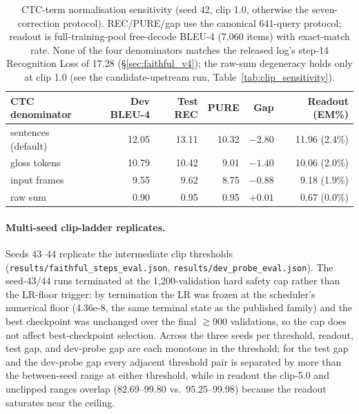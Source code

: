 \documentclass[pdflatex,sn-chicago]{sn-jnl}
\begin{document}
\begin{table}[h]
\centering
\scriptsize\setlength{\tabcolsep}{4pt}
\caption{CTC-term normalisation sensitivity (seed 42, clip 1.0, otherwise the seven-correction protocol). REC/PURE/gap use the canonical 641-query protocol; readout is full-training-pool free-decode BLEU-4 (7{,}060 items) with exact-match rate. None of the four denominators matches the released log's step-14 Recognition Loss of 17.28 (\S\ref{sec:faithful_v4}); the raw-sum degeneracy holds only at clip 1.0 (see the candidate-upstream run, Table~\ref{tab:clip_sensitivity}).}
\label{tab:ctc_sensitivity}
\begin{tabular}{lrrrrr}
\toprule
CTC denominator & Dev BLEU-4 & Test REC & PURE & Gap & Readout (EM\%) \\
\midrule
sentences (default) & 12.05 & 13.11 & 10.32 & $-2.80$ & 11.96 (2.4\%) \\
gloss tokens & 10.79 & 10.42 & 9.01 & $-1.40$ & 10.06 (2.0\%) \\
input frames & 9.55 & 9.62 & 8.75 & $-0.88$ & 9.18 (1.9\%) \\
raw sum & 0.90 & 0.95 & 0.95 & $+0.01$ & 0.67 (0.0\%) \\
\bottomrule
\end{tabular}
\end{table}


\clearpage
\paragraph{Multi-seed clip-ladder replicates.}
Seeds 43--44 replicate the intermediate clip thresholds (\texttt{results/faithful\_steps\_eval.json}, \texttt{results/dev\_probe\_eval.json}). The seed-43/44 runs terminated at the 1{,}200-validation hard safety cap rather than the LR-floor trigger: by termination the LR was frozen at the scheduler's numerical floor (4.36e-8, the same terminal state as the published family) and the best checkpoint was unchanged over the final $\gtrsim$900 validations, so the cap does not affect best-checkpoint selection. Across the three seeds per threshold, readout, test gap, and dev-probe gap are each monotone in the threshold; for the test gap and the dev-probe gap every adjacent threshold pair is separated by more than the between-seed range at either threshold, while in readout the clip-5.0 and unclipped ranges overlap (82.69--99.80 vs.\ 95.25--99.98) because the readout saturates near the ceiling.
\end{document}
